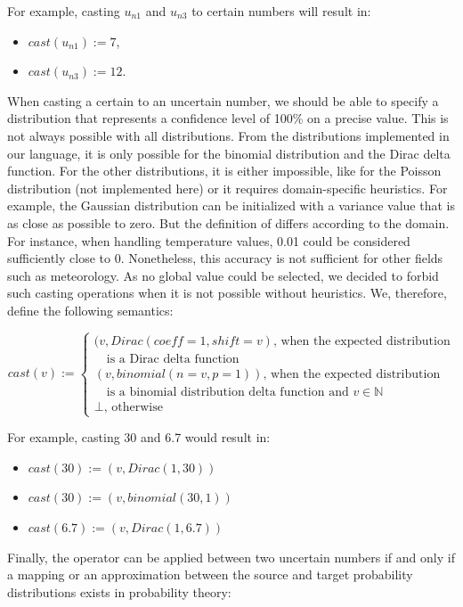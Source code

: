 For example, casting $u_{n1}$ and $u_{n3}$ to certain numbers will result in:
\begin{itemize}
	\item $cast(u_{n1}) := 7$,
	\item $cast(u_{n3}) := 12$.
\end{itemize}

When casting a certain to an uncertain number, we should be able to specify a distribution that represents a confidence level of 100\% on a precise value.
This is not always possible with all distributions.
From the distributions implemented in our language, it is only possible for the binomial distribution and the Dirac delta function.
For the other distributions, it is either impossible, like for the Poisson distribution (not implemented here) or it requires domain-specific heuristics.
For example, the Gaussian distribution can be initialized with a variance value that is as close as possible to zero.
But the definition of  differs according to the domain. 
For instance, when handling temperature values, 0.01 could be considered sufficiently close to 0.
Nonetheless, this accuracy is not sufficient for other fields such as meteorology.
As no global value could be selected, we decided to forbid such casting operations when it is not possible without heuristics.
We, therefore, define the following semantics:

\[cast(v) := \begin{cases}
						(v, Dirac(coeff=1, shift=v) \text{, when the expected distribution} \\
						\text{~~ is a Dirac delta function}\\
						(v, binomial(n=v, p=1)) \text{, when the expected distribution}\\
						\text{~~ is a binomial distribution delta function and $v \in \mathds{N}$}\\
						\perp \text{, otherwise}
					\end{cases}\]

For example, casting 30 and 6.7 would result in:
\begin{itemize}
	\item $cast(30) := (v, Dirac(1, 30))$
	\item $cast(30) := (v, binomial(30, 1))$
	\item $cast(6.7) := (v, Dirac(1, 6.7))$
\end{itemize}

Finally, the operator can be applied between two uncertain numbers if and only if a mapping or an approximation  between the source and target probability distributions exists in probability theory:

